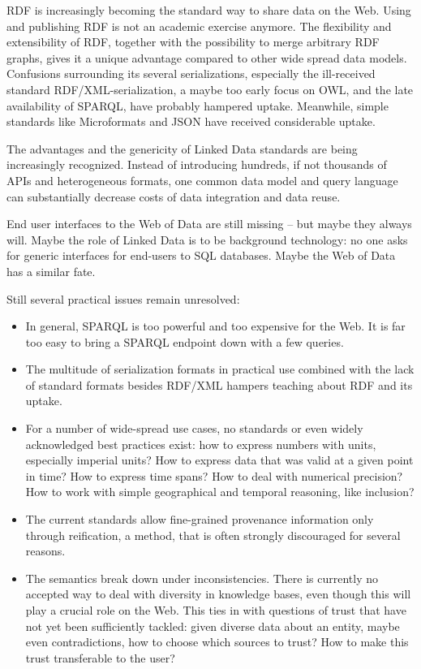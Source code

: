 \documentclass{IOS-Book-Article}
\begin{document}
RDF is increasingly becoming the standard way to share data on the Web.
Using and publishing RDF is not an academic exercise anymore.
The flexibility and extensibility of RDF, together with the possibility to merge arbitrary RDF graphs, gives it a unique advantage compared to other wide spread data models.
Confusions surrounding its several serializations, especially the ill-received standard RDF/XML-serialization, a maybe too early focus on OWL, and the late availability of SPARQL, have probably hampered uptake.
Meanwhile, simple standards like Microformats and JSON have received considerable uptake.

The advantages and the genericity of Linked Data standards are being increasingly recognized.
Instead of introducing hundreds, if not thousands of APIs and heterogeneous formats, one common data model and query language can substantially decrease costs of data integration and data reuse.

End user interfaces to the Web of Data are still missing -- but maybe they always will.
Maybe the role of Linked Data is to be background technology:
no one asks for generic interfaces for end-users to SQL databases.
Maybe the Web of Data has a similar fate.

Still several practical issues remain unresolved:
\begin{itemize}
\item In general, SPARQL is too powerful and too expensive for the Web. It is far too easy to bring a SPARQL endpoint down with a few queries.
\item The multitude of serialization formats in practical use combined with the lack of standard formats besides RDF/XML hampers teaching about RDF and its uptake.
\item For a number of wide-spread use cases, no standards or even widely acknowledged best practices exist: how to express numbers with units, especially imperial units? How to express data that was valid at a given point in time? How to express time spans? How to deal with numerical precision? How to work with simple geographical and temporal reasoning, like inclusion?
\item The current standards allow fine-grained provenance information only through reification, a method, that is often strongly discouraged for several reasons.
\item The semantics break down under inconsistencies. There is currently no accepted way to deal with diversity in knowledge bases, even though this will play a crucial role on the Web. This ties in with questions of trust that have not yet been sufficiently tackled: given diverse data about an entity, maybe even contradictions, how to choose which sources to trust? How to make this trust transferable to the user?
\end{itemize}
\end{document}
